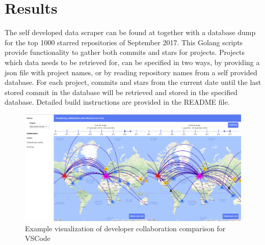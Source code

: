 \documentclass[acmtog, authorversion]{acmart}
\begin{document}
\section{Results}
The self developed data scraper can be found at \cite{githubvisualizerovertime} together with a database dump for the top 1000 starred repositories of September 2017.
This Golang scripts provide functionality to gather both commits and stars for projects.
Projects which data needs to be retrieved for, can be specified in two ways, by providing a json file with project names, or by reading repository names from a self provided database.
For each project, commits and stars from the current date until the last stored commit in the database will be retrieved and stored in the specified database.
Detailed build instructions are provided in the README file.
\begin{figure}
\includegraphics[scale=0.18]{images/vscode-compare.PNG}
\caption{Example visualization of developer collaboration comparison for VSCode}
\label{fig:collaboration}
\end{figure}
\end{document}
